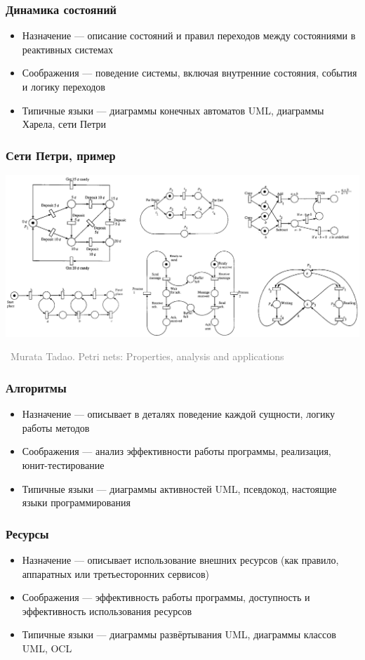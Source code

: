 \documentclass[xetex,mathserif,serif]{beamer}
\newcommand{\attribution}[1] {
	\vspace{-5mm}\begin{flushright}\begin{scriptsize}\textcolor{gray}{\textcopyright\, #1}\end{scriptsize}\end{flushright}
}
\begin{document}
	\begin{frame}
		\frametitle{Динамика состояний}
		\begin{itemize}
			\item Назначение --- описание состояний и правил переходов между состояниями в реактивных системах
			\item Соображения --- поведение системы, включая внутренние состояния, события и логику переходов
			\item Типичные языки --- диаграммы конечных автоматов UML, диаграммы Харела, сети Петри
		\end{itemize}
	\end{frame}

	\begin{frame}
		\frametitle{Сети Петри, пример}
		\begin{center}
			\includegraphics[width=\textwidth]{petriNet.png}
			\attribution{Murata Tadao. Petri nets: Properties, analysis and applications}
		\end{center}
	\end{frame}

	\begin{frame}
		\frametitle{Алгоритмы}
		\begin{itemize}
			\item Назначение --- описывает в деталях поведение каждой сущности, логику работы методов
			\item Соображения --- анализ эффективности работы программы, реализация, юнит-тестирование
			\item Типичные языки --- диаграммы активностей UML, псевдокод, настоящие языки программирования
		\end{itemize}
	\end{frame}

	\begin{frame}
		\frametitle{Ресурсы}
		\begin{itemize}
			\item Назначение --- описывает использование внешних ресурсов (как правило, аппаратных или третьесторонних сервисов)
			\item Соображения --- эффективность работы программы, доступность и эффективность использования ресурсов
			\item Типичные языки --- диаграммы развёртывания UML, диаграммы классов UML, OCL
		\end{itemize}
	\end{frame}
\end{document}
